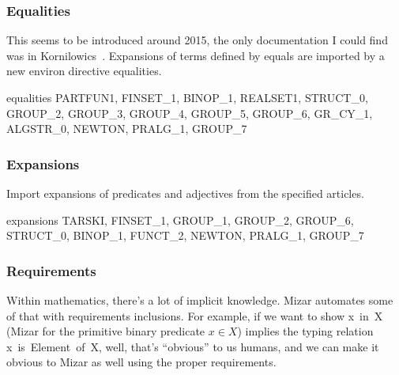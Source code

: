 \subsubsection{Equalities}
This seems to be introduced around 2015, the only documentation I could
find was in Kornilowics~\cite{kornilowicz2015definitional}.
Expansions of terms defined by {\Tt{}equals\nwendquote} are imported by a new
{\Tt{}environ\nwendquote} directive {\Tt{}equalities\nwendquote}.

\nwenddocs{}\endmoddef\nwstartdeflinemarkup{}\nwenddeflinemarkup
equalities PARTFUN1, FINSET_1, BINOP_1, REALSET1, STRUCT_0, GROUP_2,
  GROUP_3, GROUP_4, GROUP_5, GROUP_6, GR_CY_1,
  ALGSTR_0, NEWTON, PRALG_1, GROUP_7
\nwendcode{}\nwdocspar

\subsubsection{Expansions}
Import expansions of predicates and adjectives from the specified
articles.

\nwenddocs{}\endmoddef\nwstartdeflinemarkup{}\nwenddeflinemarkup
expansions TARSKI, FINSET_1, GROUP_1, GROUP_2, GROUP_6, STRUCT_0, BINOP_1,
  FUNCT_2, NEWTON, PRALG_1, GROUP_7
\nwendcode{}\nwdocspar

\subsubsection{Requirements} Within mathematics, there's a lot of implicit
knowledge. Mizar automates some of that with {\Tt{}requirements\nwendquote}
inclusions. For example, if we want to show {\Tt{}x\ in\ X\nwendquote}
(Mizar for the primitive binary predicate $x\in X$) implies
the typing relation {\Tt{}x\ is\ Element\ of\ X\nwendquote}, well, that's ``obvious'' to
us humans, and we can make it obvious to Mizar as well using the proper
requirements.

